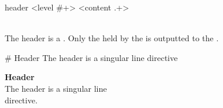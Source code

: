 \begin{identifier}{header}
<level #+> <content .+>
\end{identifier}
 \\

The header is a . Only the  held by the  is outputted to the . \\

\begin{examples}
  \begin{examplesource}
# Header
The header is a singular line
directive
  \end{examplesource}
  \begin{exampleoutput}
    \textbf{\quad\Large Header}\\
    The header is a singular line\\
    directive.
  \end{exampleoutput}
\end{examples}

